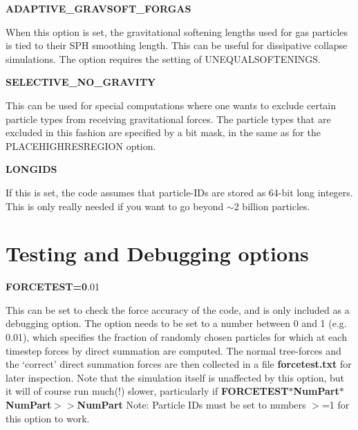 \begin{DoxyItemize}
\item {\bfseries ADAPTIVE\_\-GRAVSOFT\_\-FORGAS} \par
 When this option is set, the gravitational softening lengths used for gas particles is tied to their SPH smoothing length. This can be useful for dissipative collapse simulations. The option requires the setting of UNEQUALSOFTENINGS.
\end{DoxyItemize}


\begin{DoxyItemize}
\item {\bfseries SELECTIVE\_\-NO\_\-GRAVITY} \par
 This can be used for special computations where one wants to exclude certain particle types from receiving gravitational forces. The particle types that are excluded in this fashion are specified by a bit mask, in the same as for the PLACEHIGHRESREGION option.
\end{DoxyItemize}


\begin{DoxyItemize}
\item {\bfseries LONGIDS} \par
 If this is set, the code assumes that particle-\/IDs are stored as 64-\/bit long integers. This is only really needed if you want to go beyond $\sim$2 billion particles.
\end{DoxyItemize}

\par
 \hypertarget{Gadget-Makefile_secmake8}{}\section{Testing and Debugging options}\label{Gadget-Makefile_secmake8}

\begin{DoxyItemize}
\item {\bfseries FORCETEST=0}.01 \par
 This can be set to check the force accuracy of the code, and is only included as a debugging option. The option needs to be set to a number between 0 and 1 (e.g. 0.01), which specifies the fraction of randomly chosen particles for which at each timestep forces by direct summation are computed. The normal tree-\/forces and the `correct' direct summation forces are then collected in a file {\bfseries forcetest.txt} for later inspection. Note that the simulation itself is unaffected by this option, but it will of course run much(!) slower, particularly if {\bfseries  FORCETEST$\ast$NumPart$\ast$NumPart$>$$>$NumPart} Note: Particle IDs must be set to numbers $>$=1 for this option to work.
\end{DoxyItemize}

